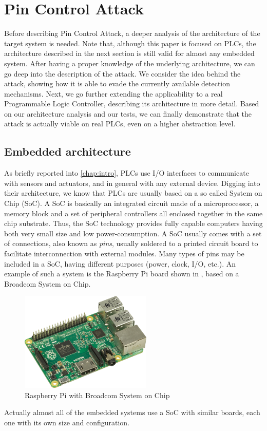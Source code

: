 \chapter{Pin Control Attack}
\label{chap:attack}

Before describing Pin Control Attack, a deeper analysis of the architecture of the target system is needed.
Note that, although this paper is focused on PLCs, the architecture described in the next section is still valid for almost any embedded system.
After having a proper knowledge of the underlying architecture, we can go deep into the description of the attack.
We consider the idea behind the attack, showing how it is able to evade the currently available detection mechanisms.
Next, we go further extending the applicability to a real Programmable Logic Controller, describing its architecture in more detail.
Based on our architecture analysis and our tests, we can finally demonstrate that the attack is actually viable on real PLCs, even on a higher abstraction level.


\section{Embedded architecture}
\label{sec:embed_arch}

As briefly reported into \chap \ref{chap:intro}, PLCs use I/O interfaces to communicate with sensors and actuators, and in general with any external device.
Digging into their architecture, we know that PLCs are usually based on a so called System on Chip (SoC).
A SoC is basically an integrated circuit made of a microprocessor, a memory block and a set of peripheral controllers all enclosed together in the same chip substrate.
Thus, the SoC technology provides fully capable computers having both very small size and low power-consumption.
A SoC usually comes with a set of connections, also known as \emph{pins}, usually soldered to a printed circuit board to facilitate interconnection with external modules.
Many types of pins may be included in a SoC, having different purposes (power, clock, I/O, etc.).
An example of such a system is the Raspberry Pi board shown in \myfig{\ref{fig:raspberry}}, based on a Broadcom System on Chip.
\begin{figure}[h]
\centerline{\includegraphics[width=0.56\textwidth]{res/raspberry}}
\caption{Raspberry Pi \cite{raspberry} with Broadcom System on Chip \label{fig:raspberry}}
\end{figure}
Actually almost all of the embedded systems use a SoC with similar boards, each one with its own size and configuration.

